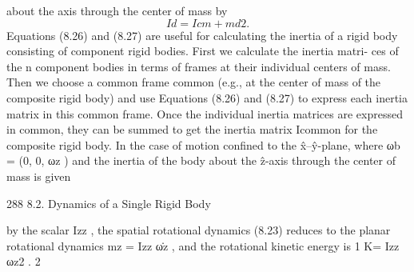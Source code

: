 \documentclass[12pt,a4paper]{article}
\begin{document}
about the axis through the center of mass by
\begin{equation}
Id = Icm + md2 .
\label{eq:8.28}
\end{equation}
    Equations (8.26) and (8.27) are useful for calculating the inertia of a rigid
body consisting of component rigid bodies. First we calculate the inertia matri-
ces of the n component bodies in terms of frames at their individual centers of
mass. Then we choose a common frame {common} (e.g., at the center of mass
of the composite rigid body) and use Equations (8.26) and (8.27) to express each
inertia matrix in this common frame. Once the individual inertia matrices are
expressed in {common}, they can be summed to get the inertia matrix Icommon
for the composite rigid body.
    In the case of motion confined to the x̂–ŷ-plane, where ωb = (0, 0, ωz ) and
the inertia of the body about the ẑ-axis through the center of mass is given


288                                                      8.2. Dynamics of a Single Rigid Body

by the scalar Izz , the spatial rotational dynamics (8.23) reduces to the planar
rotational dynamics
                                   mz = Izz ω̇z ,
and the rotational kinetic energy is
                                                  1
                                           K=       Izz ωz2 .
                                                  2
\end{document}

